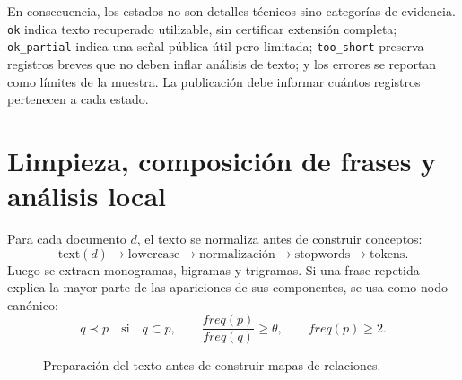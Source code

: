 \documentclass[11pt]{article}
\begin{document}
En consecuencia, los estados no son detalles técnicos sino categorías de
evidencia. \texttt{ok} indica texto recuperado utilizable, sin certificar extensión completa;
\texttt{ok\_partial} indica una señal pública útil pero limitada; \texttt{too\_short}
preserva registros breves que no deben inflar análisis de texto; y los errores
se reportan como límites de la muestra. La publicación debe informar cuántos
registros pertenecen a cada estado.

\section{Limpieza, composición de frases y análisis local}

Para cada documento \(d\), el texto se normaliza antes de construir conceptos:
\[
\text{text}(d)\to \text{lowercase}\to \text{normalización}\to
\text{stopwords}\to \text{tokens}.
\]
Luego se extraen monogramas, bigramas y trigramas. Si una frase repetida explica
la mayor parte de las apariciones de sus componentes, se usa como nodo canónico:
\[
q\prec p
\quad\text{si}\quad
q\subset p,\qquad
\frac{freq(p)}{freq(q)}\geq \theta,\qquad freq(p)\geq 2.
\]

\begin{figure}[ht]
\centering
{}
\caption{Preparación del texto antes de construir mapas de relaciones.}
\end{figure}
\end{document}
